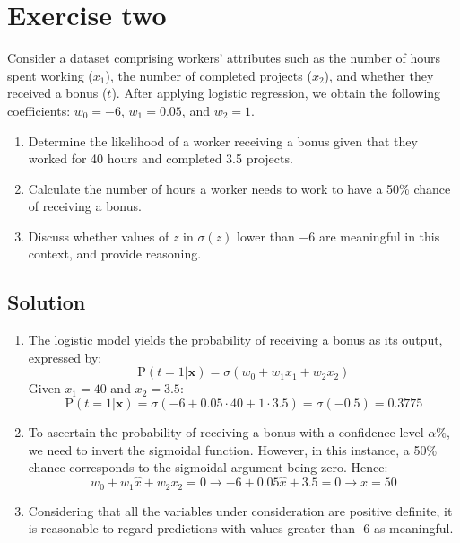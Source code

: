 \section{Exercise two}

Consider a dataset comprising workers' attributes such as the number of hours spent working ($x_1$), the number of completed projects ($x_2$), and whether they received a bonus ($t$).
After applying logistic regression, we obtain the following coefficients: $w_0=-6$, $w_1=0.05$, and $w_2=1$. 
\begin{enumerate}
    \item Determine the likelihood of a worker receiving a bonus given that they worked for 40 hours and completed 3.5 projects.
    \item Calculate the number of hours a worker needs to work to have a 50\% chance of receiving a bonus.
    \item Discuss whether values of $z$ in $\sigma(z)$ lower than $-6$ are meaningful in this context, and provide reasoning.
\end{enumerate}

\subsection*{Solution}
\begin{enumerate}
    \item The logistic model yields the probability of receiving a bonus as its output, expressed by:
        \[\text{P}(t=1|\textbf{x})=\sigma(w_0+w_1x_1+w_2x_2)\]
        Given $x_1=40$ and $x_2=3.5$: 
        \[\text{P}(t=1|\textbf{x})=\sigma(-6+0.05\cdot 40+1\cdot 3.5)=\sigma(-0.5)=0.3775\]
    \item To ascertain the probability of receiving a bonus with a confidence level $\alpha\%$, we need to invert the sigmoidal function.
        However, in this instance, a 50\% chance corresponds to the sigmoidal argument being zero. 
        Hence:
        \[w_0+w_1\hat{x}+w_2x_2=0\rightarrow -6+0.05\hat{x}+3.5=0\rightarrow\hat{x}=50\]
    \item Considering that all the variables under consideration are positive definite, it is reasonable to regard predictions with values greater than -6 as meaningful.
\end{enumerate}